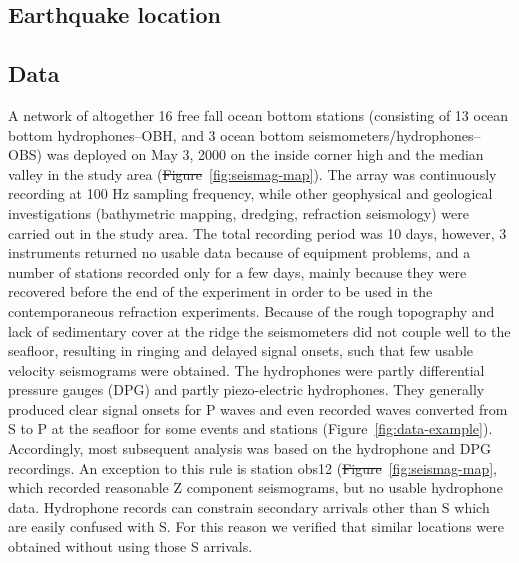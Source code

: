 \documentclass[jgrga]{agu2001} %
\newlength{\tw}
\providecommand{\DIFadd}[1]{{\protect\color{blue}\uwave{#1}}} %
\providecommand{\DIFdel}[1]{{\protect\color{red}\sout{#1}}}                      %
\providecommand{\DIFaddbegin}{} %
\providecommand{\DIFaddend}{} %
\providecommand{\DIFdelbegin}{} %
\providecommand{\DIFdelend}{} %
\begin{document}
\begin{article}
\section{Earthquake location}

\subsection{Data}

A network of altogether 16 free fall ocean bottom stations (consisting
of 13 ocean bottom hydro\-phones--OBH, and 3 ocean bottom seismometers/hydro\-phones--OBS) was deployed
on May 3, 2000 on the inside corner high and the median valley in the
study area (\DIFdelbegin \DIFdel{Figure}\DIFdelend \DIFaddbegin \DIFadd{Plate}\DIFaddend ~\ref{fig:seismag-map}).  The array was continuously recording at 100 Hz sampling frequency, while other
geophysical and geological investigations (bathymetric mapping,
dredging, refraction seismology) were carried out in the study area.
The total recording period was 10 days, however, 3 instruments
returned no usable data because of equipment problems, and a number of
stations recorded only for a few days, mainly because they were
recovered before the end of the experiment in order to be used in the
contemporaneous refraction experiments.  Because of the rough
topography and lack of sedimentary cover at the ridge the seismometers
did not couple well to the seafloor, resulting in ringing and delayed
signal onsets, such that few usable velocity seismograms were
obtained.  The hydrophones were partly differential pressure gauges
(DPG) and partly piezo-electric hydrophones.
They generally produced clear signal onsets for
P waves and even recorded waves converted from S to P at the seafloor
for some events and stations
(Figure~\ref{fig:data-example}). Accordingly, most subsequent analysis
was based on the hydrophone and DPG recordings.  An
exception to this rule is station obs12 (\DIFdelbegin \DIFdel{Figure}\DIFdelend \DIFaddbegin \DIFadd{Plate}\DIFaddend ~\ref{fig:seismag-map}, which recorded reasonable Z
component seismograms, but no usable hydrophone data.  Hydrophone
records can constrain secondary arrivals other than S which are easily
confused with S.  For this reason we verified that similar locations
were obtained without using those S arrivals.


\end{article}
\end{document}
